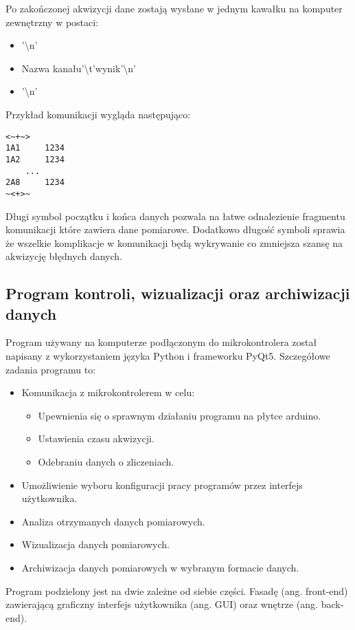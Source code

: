 Po zakończonej akwizycji dane zostają wysłane w jednym kawałku na komputer zewnętrzny w postaci:
\begin{itemize}
        \item \detokenize{<~+~>}'\textbackslash n'
        \item {Nazwa kanału}'\textbackslash t'{wynik}'\textbackslash n'
        \item \detokenize{~<+>~}'\textbackslash n'
\end{itemize}
Przykład komunikacji wygląda następująco:
\begin{lstlisting}
<~+~>
1A1     1234
1A2     1234 
    ...
2A8     1234
~<+>~
\end{lstlisting}

Długi symbol początku i końca danych pozwala na łatwe odnalezienie fragmentu komunikacji które zawiera dane pomiarowe. Dodatkowo długość symboli sprawia że wszelkie komplikacje w komunikacji będą wykrywanie co zmniejsza szansę na akwizycję błędnych danych. 

\subsection{Program kontroli, wizualizacji oraz archiwizacji danych}

Program używany na komputerze podłączonym do mikrokontrolera został napisany z wykorzystaniem języka Python i frameworku PyQt5.
Szczegółowe zadania programu to:
\begin{itemize}
        \item Komunikacja z mikrokontrolerem w celu:
        \begin{itemize}
                \item Upewnienia się o sprawnym działaniu programu na płytce arduino.
                \item Ustawienia czasu akwizycji.
                \item Odebraniu danych o zliczeniach. 
        \end{itemize}
        \item Umożliwienie wyboru konfiguracji pracy programów przez interfejs użytkownika.
        \item Analiza otrzymanych danych pomiarowych.
        \item Wizualizacja danych pomiarowych.
        \item Archiwizacja danych pomiarowych w wybranym formacie danych.
\end{itemize}

Program podzielony jest na dwie zależne od siebie części. Fasadę (ang. front-end) zawierającą graficzny interfejs użytkownika (ang. GUI) oraz wnętrze (ang. back-end).

